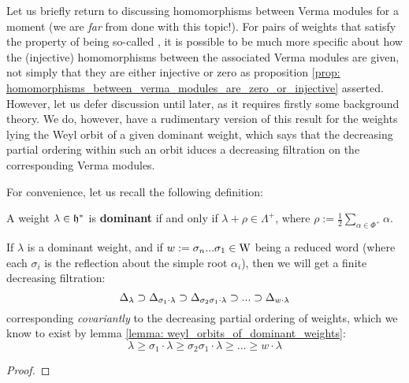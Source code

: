         Let us briefly return to discussing homomorphisms between Verma modules for a moment (we are \textit{far} from done with this topic!). For pairs of weights that satisfy the property of being so-called , it is possible to be much more specific about how the (injective) homomorphisms between the associated Verma modules are given, not simply that they are either injective or zero as proposition \ref{prop: homomorphisms_between_verma_modules_are_zero_or_injective} asserted. However, let us defer discussion until later, as it requires firstly some background theory. We do, however, have a rudimentary version of this result for the weights lying the Weyl orbit of a given dominant weight, which says that the decreasing partial ordering within such an orbit iduces a decreasing filtration on the corresponding Verma modules.
        
        For convenience, let us recall the following definition:
        \begin{definition} \label{def: dominant_weights}
            A weight $\lambda \in \mathfrak{h}^*$ is \textbf{dominant} if and only if $\lambda + \rho \in \Lambda^+$, where $\rho := \frac12 \sum_{\alpha \in \Phi^+} \alpha$.
        \end{definition}
        \begin{remark}
            
        \end{remark}
        \begin{lemma} \label{lemma: weyl_orbits_of_dominant_weights}
            \cite[Lemma 13.2A]{humphreys_lie_algebras}
        \end{lemma}
        \begin{theorem} \label{theorem: weyl_filtrations_for_dominant_verma_modules}
            If $\lambda$ is a dominant weight, and if $w := \sigma_n ... \sigma_1 \in \mathrm{W}$ being a reduced word (where each $\sigma_i$ is the reflection about the simple root $\alpha_i$), then we will get a finite decreasing filtration:
                $$\Delta_{\lambda} \supset \Delta_{\sigma_1 \cdot \lambda} \supset \Delta_{\sigma_2 \sigma_1 \cdot \lambda} \supset ... \supset \Delta_{w \cdot \lambda}$$
            corresponding \textit{covariantly} to the decreasing partial ordering of weights, which we know to exist by lemma \ref{lemma: weyl_orbits_of_dominant_weights}:
                $$\lambda \geq \sigma_1 \cdot \lambda \geq \sigma_2 \sigma_1 \cdot \lambda \geq ... \geq w \cdot \lambda$$
        \end{theorem}
            \begin{proof}
                
            \end{proof}

